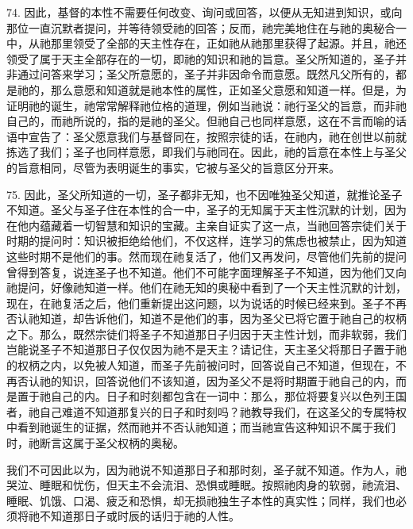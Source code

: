 74. 因此，基督的本性不需要任何改变、询问或回答，以便从无知进到知识，或向那位一直沉默者提问，并等待领受祂的回答；反而，祂完美地住在与祂的奥秘合一中，从祂那里领受了全部的天主性存在，正如祂从祂那里获得了起源。并且，祂还领受了属于天主全部存在的一切，即祂的知识和祂的旨意。圣父所知道的，圣子并非通过问答来学习；圣父所意愿的，圣子并非因命令而意愿。既然凡父所有的，都是祂的，那么意愿和知道就是祂本性的属性，正如圣父意愿和知道一样。但是，为证明祂的诞生，祂常常解释祂位格的道理，例如当祂说：祂行圣父的旨意，而非祂自己的，而祂所说的，指的是祂的圣父。但祂自己也同样意愿，这在不言而喻的话语中宣告了：圣父愿意我们与基督同在，按照宗徒的话，在祂内，祂在创世以前就拣选了我们；圣子也同样意愿，即我们与祂同在。因此，祂的旨意在本性上与圣父的旨意相同，尽管为表明诞生的事实，它被与圣父的旨意区分开来。\par

75. 因此，圣父所知道的一切，圣子都非无知，也不因唯独圣父知道，就推论圣子不知道。圣父与圣子住在本性的合一中，圣子的无知属于天主性沉默的计划，因为在他内蕴藏着一切智慧和知识的宝藏。主亲自证实了这一点，当祂回答宗徒们关于时期的提问时：知识被拒绝给他们，不仅这样，连学习的焦虑也被禁止，因为知道这些时期不是他们的事。然而现在祂复活了，他们又再发问，尽管他们先前的提问曾得到答复，说连圣子也不知道。他们不可能字面理解圣子不知道，因为他们又向祂提问，好像祂知道一样。他们在祂无知的奥秘中看到了一个天主性沉默的计划，现在，在祂复活之后，他们重新提出这问题，以为说话的时候已经来到。圣子不再否认祂知道，却告诉他们，知道不是他们的事，因为圣父已将它置于祂自己的权柄之下。那么，既然宗徒们将圣子不知道那日子归因于天主性计划，而非软弱，我们岂能说圣子不知道那日子仅仅因为祂不是天主？请记住，天主圣父将那日子置于祂的权柄之内，以免被人知道，而圣子先前被问时，回答说自己不知道，但现在，不再否认祂的知识，回答说他们不该知道，因为圣父不是将时期置于祂自己的内，而是置于祂自己的内。日子和时刻都包含在一词中：那么，那位将要复兴以色列王国者，祂自己难道不知道那复兴的日子和时刻吗？祂教导我们，在这圣父的专属特权中看到祂诞生的证据，然而祂并不否认祂知道；而当祂宣告这种知识不属于我们时，祂断言这属于圣父权柄的奥秘。\par

我们不可因此以为，因为祂说不知道那日子和那时刻，圣子就不知道。作为人，祂哭泣、睡眠和忧伤，但天主不会流泪、恐惧或睡眠。按照祂肉身的软弱，祂流泪、睡眠、饥饿、口渴、疲乏和恐惧，却无损祂独生子本性的真实性；同样，我们也必须将祂不知道那日子或时辰的话归于祂的人性。\par

